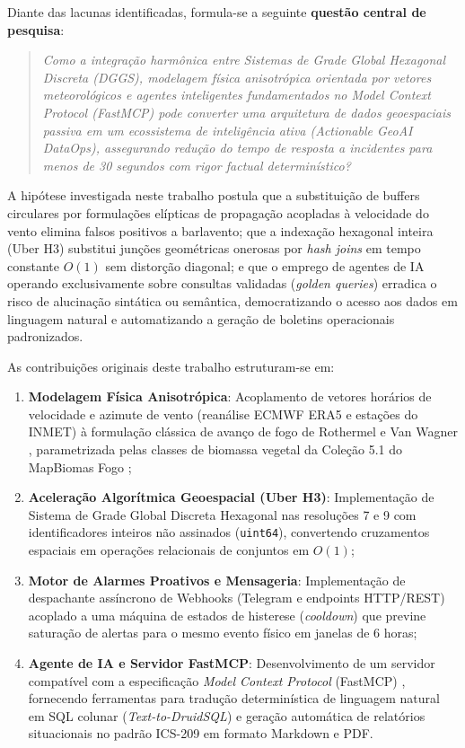 Diante das lacunas identificadas, formula-se a seguinte \textbf{questão central de pesquisa}:

\begin{quote}
\textit{Como a integração harmônica entre Sistemas de Grade Global Hexagonal Discreta (DGGS), modelagem física anisotrópica orientada por vetores meteorológicos e agentes inteligentes fundamentados no Model Context Protocol (FastMCP) pode converter uma arquitetura de dados geoespaciais passiva em um ecossistema de inteligência ativa (Actionable GeoAI DataOps), assegurando redução do tempo de resposta a incidentes para menos de 30 segundos com rigor factual determinístico?}
\end{quote}

A hipótese investigada neste trabalho postula que a substituição de buffers circulares por formulações elípticas de propagação acopladas à velocidade do vento elimina falsos positivos a barlavento; que a indexação hexagonal inteira (Uber H3) substitui junções geométricas onerosas por \textit{hash joins} em tempo constante $O(1)$ sem distorção diagonal; e que o emprego de agentes de IA operando exclusivamente sobre consultas validadas (\textit{golden queries}) erradica o risco de alucinação sintática ou semântica, democratizando o acesso aos dados em linguagem natural e automatizando a geração de boletins operacionais padronizados.

As contribuições originais deste trabalho estruturam-se em:
\begin{enumerate}
    \item \textbf{Modelagem Física Anisotrópica}: Acoplamento de vetores horários de velocidade e azimute de vento (reanálise ECMWF ERA5 \cite{hersbach2020era5} e estações do INMET) à formulação clássica de avanço de fogo de Rothermel \cite{rothermel1972mathematical} e Van Wagner \cite{vanwagner1969combined}, parametrizada pelas classes de biomassa vegetal da Coleção 5.1 do MapBiomas Fogo \cite{mapbiomas2026fogo};
    \item \textbf{Aceleração Algorítmica Geoespacial (Uber H3)}: Implementação de Sistema de Grade Global Discreta Hexagonal \cite{uber_h3_2018} nas resoluções 7 e 9 com identificadores inteiros não assinados (\texttt{uint64}), convertendo cruzamentos espaciais em operações relacionais de conjuntos em $O(1)$;
    \item \textbf{Motor de Alarmes Proativos e Mensageria}: Implementação de despachante assíncrono de Webhooks (Telegram e endpoints HTTP/REST) acoplado a uma máquina de estados de histerese (\textit{cooldown}) que previne saturação de alertas para o mesmo evento físico em janelas de 6 horas;
    \item \textbf{Agente de IA e Servidor FastMCP}: Desenvolvimento de um servidor compatível com a especificação \textit{Model Context Protocol} (FastMCP) \cite{anthropic2024mcp}, fornecendo ferramentas para tradução determinística de linguagem natural em SQL colunar (\textit{Text-to-DruidSQL}) e geração automática de relatórios situacionais no padrão ICS-209 \cite{fema2020ics209} em formato Markdown e PDF.
\end{enumerate}

